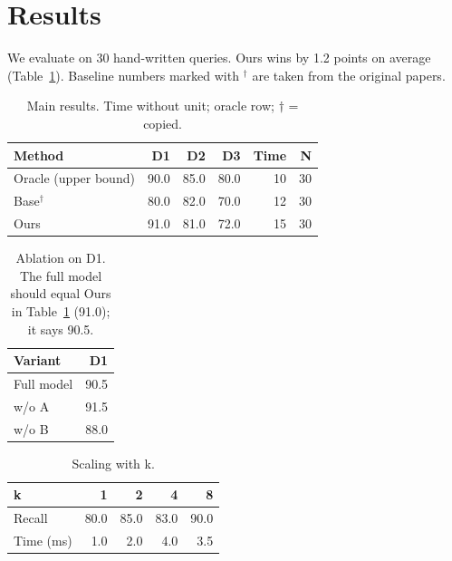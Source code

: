 \documentclass{article}
\begin{document}
\begin{abstract}
Ours consistently outperforms all baselines on every dataset, with no degradation in latency.
\end{abstract}
\section{Results}
We evaluate on 30 hand-written queries. Ours wins by 1.2 points on average (Table~\ref{tab:main}).
Baseline numbers marked with $^\dagger$ are taken from the original papers.
\begin{table}[h]\centering\caption{Main results. Time without unit; oracle row; $\dagger$ = copied.}\label{tab:main}
\begin{tabular}{lrrrrr}
\toprule
Method & D1 & D2 & D3 & Time & N \\
\midrule
Oracle (upper bound) & 90.0 & 85.0 & 80.0 & 10 & 30 \\
Base$^\dagger$ & 80.0 & 82.0 & 70.0 & 12 & 30 \\
Ours & 91.0 & 81.0 & 72.0 & 15 & 30 \\
\bottomrule
\end{tabular}\end{table}
\begin{table}[h]\centering\caption{Ablation on D1. The full model should equal Ours in Table~\ref{tab:main} (91.0); it says 90.5.}
\begin{tabular}{lr}
\toprule
Variant & D1 \\
\midrule
Full model & 90.5 \\
w/o A & 91.5 \\
w/o B & 88.0 \\
\bottomrule
\end{tabular}\end{table}
\begin{table}[h]\centering\caption{Scaling with k.}
\begin{tabular}{lrrrr}
\toprule
k & 1 & 2 & 4 & 8 \\
\midrule
Recall & 80.0 & 85.0 & 83.0 & 90.0 \\
Time (ms) & 1.0 & 2.0 & 4.0 & 3.5 \\
\bottomrule
\end{tabular}\end{table}
\end{document}
